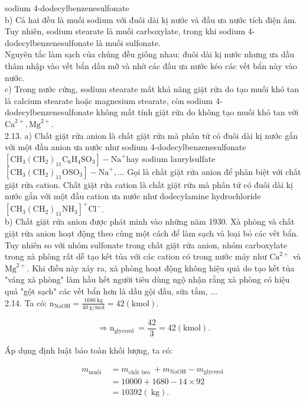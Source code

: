 \documentclass[10pt]{article}
\begin{document}
sodium 4-dodecylbenzenesulfonate\\
b) Cả hai đều là muối sodium với đuôi dài kị nước và đầu ưa nước tích điện âm. Tuy nhiên, sodium stearate là muối carboxylate, trong khi sodium 4-dodecylbenzenesulfonate là muối sulfonate.\\
Nguyên tắc làm sạch của chúng đều giống nhau: đuôi dài kị nước nhưng ưa dầu thâm nhập vào vết bẩn dầu mỡ và nhờ các đầu ưa nước kéo các vết bẩn này vào nước.\\
c) Trong nước cứng, sodium stearate mất khả năng giặt rửa do tạo muối khó tan là calcium stearate hoặc magnesium stearate, còn sodium 4-dodecylbenzenesulfonate không mất tính giặt rửa do không tạo muối khó tan với $\mathrm{Ca}^{2+}, \mathrm{Mg}^{2+}$.\\
2.13. a) Chất giặt rửa anion là chất giặt rửa mà phân tử có đuôi dài kị nước gắn với một đầu anion ưa nước như sodium 4-dodecylbenzenesulfonate $\left[\mathrm{CH}_{3}\left(\mathrm{CH}_{2}\right)_{11} \mathrm{C}_{6} \mathrm{H}_{4} \mathrm{SO}_{3}\right]-\mathrm{Na}^{+}$hay sodium laurylsulfate $\left[\mathrm{CH}_{3}\left(\mathrm{CH}_{2}\right)_{11} \mathrm{OSO}_{3}\right]-\mathrm{Na}^{+}, \ldots$ Gọi là chất giặt rửa anion để phân biệt với chất giặt rửa cation. Chất giặt rửa cation là chất giặt rửa mà phân tử có đuôi dài kị nước gắn với một đầu cation ưa nước như dodecylamine hydrochloride $\left[\mathrm{CH}_{3}\left(\mathrm{CH}_{2}\right)_{11} \mathrm{NH}_{3}\right]^{+} \mathrm{Cl}^{-}$.\\
b) Chất giặt rửa anion được phát minh vào những năm 1930. Xà phòng và chất giặt rửa anion hoạt động theo cùng một cách để làm sạch và loại bỏ các vết bẩn. Tuy nhiên so với nhóm sulfonate trong chất giặt rửa anion, nhóm carboxylate trong xà phòng rất dễ tạo kết tủa với các cation có trong nước máy như $\mathrm{Ca}^{2+}$ và $\mathrm{Mg}^{2+}$. Khi điều này xảy ra, xà phòng hoạt động không hiệu quả do tạo kết tủa "váng xà phòng" làm hầu hết người tiêu dùng ngộ nhận rằng xà phòng có hiệu quả "gột sạch" các vết bẩn hơn là dầu gội đầu, sữa tắm, ...\\
2.14. Ta có: $\mathrm{n}_{\mathrm{NaOH}}=\frac{1680 \mathrm{~kg}}{40 \mathrm{~g} / \mathrm{mol}}=42(\mathrm{kmol})$.

$$
\Rightarrow \mathrm{n}_{\text {glycerol }}=\frac{42}{3}=42(\mathrm{kmol}) .
$$

Áp dụng định luật bảo toàn khối lượng, ta có:

$$
\begin{aligned}
m_{\text {muối }} & =m_{\text {chất béo }}+m_{\mathrm{NaOH}}-m_{\text {glycerol }} \\
& =10000+1680-14 \times 92 \\
& =10392(\mathrm{~kg}) .
\end{aligned}
$$
\end{document}
